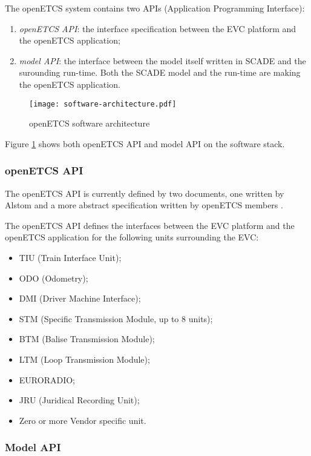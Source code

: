 
The openETCS system contains two APIs (Application Programming
Interface):
\begin{enumerate}
\item \emph{openETCS API}: the interface specification between the
EVC platform and the openETCS application;
\item \emph{model API}: the interface between the model itself written in
SCADE and the surounding run-time. Both the SCADE model and the
run-time are making the openETCS application.
\end{enumerate}

\begin{figure}[h]
\centering
\texttt{[image: software-architecture.pdf]}
\caption{openETCS software architecture}
\label{fig:software-architecture}
\end{figure}

Figure \ref{fig:software-architecture} shows both openETCS API and
model API on the software stack.

\subsubsection{openETCS API}

The openETCS API is currently defined by two documents, one written by
Alstom \cite{alstom-api} and a more abstract specification written by
openETCS members \cite{openetcs-api}.

The openETCS API defines the interfaces between the EVC platform and
the openETCS application for the following units surrounding the EVC:
\begin{itemize}
\item TIU (Train Interface Unit);
\item ODO (Odometry);
\item DMI (Driver Machine Interface);
\item STM (Specific Transmission Module, up to 8 units);
\item BTM (Balise Transmission Module);
\item LTM (Loop Transmission Module);
\item EURORADIO;
\item JRU (Juridical Recording Unit);
\item Zero or more Vendor specific unit.
\end{itemize}


\subsubsection{Model API}

